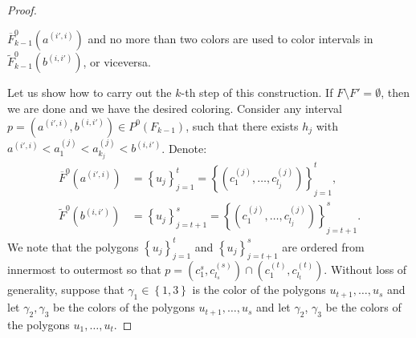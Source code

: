 \documentclass[12pt]{article}
\theoremstyle{definition}
\begin{document}
\begin{proof}
\begin{enumerate}
             $\overline{F}_{k-1}^{0}\left(a^{\left(i', i\right)}\right)$ 
             and no more than two colors are used
             to color intervals in
             $\widetilde{F}_{k-1}^{0}\left(b^{\left(i,i'\right)}\right)$,
             or viceversa.
         \end{enumerate}
         Let us show how to carry out
         the $k$-th step of this
         construction.
         If $F \setminus F' = \emptyset$,
         then we are done and we have
         the desired coloring.
         Consider any interval
         $p = \left(a^{\left(i', i\right)},
         b^{\left(i, i'\right)}\right)
         \in P^{0}\left(F_{k-1}\right)$,
         such that there
         exists $h_{j}$ with
         $a^{\left(i', i\right)} <
         a_1^{\left(j\right)} < a_{k_{j}}^{\left(j\right)}
         < b^{\left(i, i'\right)}$.
         Denote:
         \begin{align*}
             \overline{F}^{0}\left(a^{\left(i', i\right)}\right) &= 
             \left\{u_{j}\right\}_{j = 1}^{t} = 
             \left\{\left(c_1^{\left(j\right)}, \ldots, 
             c_{l_{j}}^{\left(j\right)}\right)\right\}_{j =1}^{t}, \\
             \widetilde{F}^{0}\left(b^{\left(i, i'\right)}\right) &= 
             \left\{u_{j}\right\}_{j = t+1}^{s} = 
             \left\{\left(c_1^{\left(j\right)}, \ldots,
             c_{l_{j}}^{\left(j\right)}\right)\right\}_{j =t +1}^{s}.
         \end{align*}
         We note that the polygons
         $\left\{u_{j}\right\}_{j=1}^{t}$ 
         and $\left\{u_{j}\right\}_{j=t+1}^{s}$ 
         are ordered from innermost
         to outermost so that
         $p = \left(c_1^{s}, c_{l_{s}}^{\left(s\right)}\right)
         \cap \left(c_1^{\left(t\right)},
         c_{l_{t}}^{\left(t\right)}\right)$.
         Without loss of generality,
         suppose that $\gamma_1 \in 
         \left\{1, 3\right\}$ is the
         color of the polygons 
         $u_{t+1}, \ldots, u_{s}$ 
         and let $\gamma_2, \gamma_3$
         be the colors of the polygons
         $u_{t+1}, \ldots, u_{s}$ 
         and let $\gamma_2$, $\gamma_3$
         be the colors of the polygons
         $u_1, \ldots, u_{t}$.
         

\end{proof}
\end{document}
